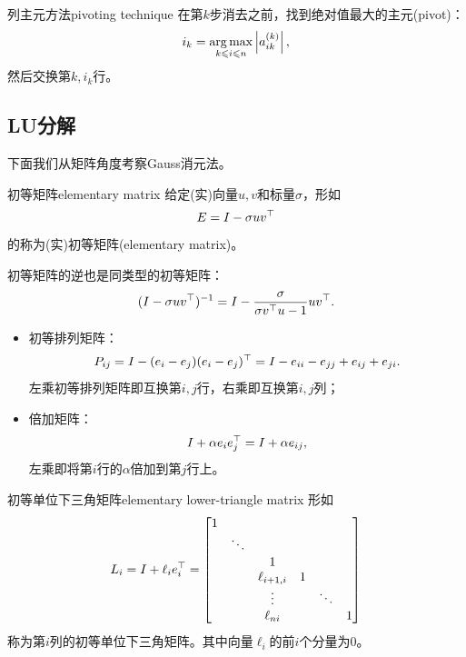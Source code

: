\begin{theorem}
    {列主元方法}{pivoting technique}
    在第$k$步消去之前，找到绝对值最大的主元(pivot)：
    \begin{equation}
        i_k=\mathop{\arg\max}\limits_{k\leqslant i\leqslant n}\left\lvert a_{ik}^{(k)}\right\rvert,
    \end{equation}
    然后交换第$k,i_k$行。
\end{theorem}

\subsection{LU分解}

下面我们从矩阵角度考察Gauss消元法。

\begin{definition}
    {初等矩阵}{elementary matrix}
    给定(实)向量$u,v$和标量$\sigma$，形如
    \begin{equation}
        E=I-\sigma uv^\top
    \end{equation}
    的称为(实)初等矩阵(elementary matrix)。
\end{definition}

\begin{corollary}
    初等矩阵的逆也是同类型的初等矩阵：
    \begin{equation}
        (I-\sigma uv^\top)^{-1}=I-\frac{\sigma}{\sigma v^\top u-1}uv^\top.
    \end{equation}
\end{corollary}

\begin{example}
    {}{}
    \begin{itemize}
        \item 初等排列矩阵：
        \[
            P_{ij}=I-(e_i-e_j)(e_i-e_j)^\top=I-e_{ii}-e_{jj}+e_{ij}+e_{ji}.
        \]
        左乘初等排列矩阵即互换第$i,j$行，右乘即互换第$i,j$列；
        \item 倍加矩阵：
        \[
            I+\alpha e_ie_j^\top=I+\alpha e_{ij},
        \]
        左乘即将第$i$行的$\alpha$倍加到第$j$行上。
    \end{itemize}
\end{example}

\begin{definition}
    {初等单位下三角矩阵}{elementary lower-triangle matrix}
    形如
    \begin{equation}
        L_i=I+\ell_ie_i^\top=\begin{bmatrix}
            1\\ &\ddots\\ &&1\\ &&\ell_{i+1,i}&1\\ &&\vdots&&\ddots\\ &&\ell_{ni}&&&1
        \end{bmatrix}
    \end{equation}
    称为第$i$列的初等单位下三角矩阵。其中向量$\ell_i$的前$i$个分量为0。
\end{definition}

